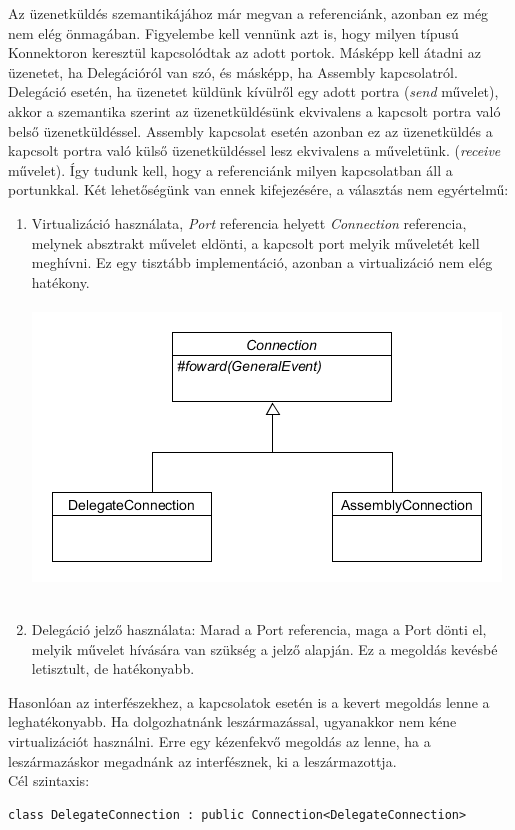 \documentclass[a4paper,12pt]{report}
\begin{document}
Az üzenetküldés szemantikájához már megvan a referenciánk, azonban ez még nem elég önmagában. Figyelembe kell vennünk azt is, hogy milyen típusú Konnektoron keresztül kapcsolódtak az adott portok. Másképp kell átadni az üzenetet, ha Delegációról van szó, és másképp, ha Assembly kapcsolatról. Delegáció esetén, ha üzenetet küldünk kívülről egy adott portra (\textit{send} művelet), akkor a szemantika szerint az üzenetküldésünk ekvivalens a kapcsolt portra való belső üzenetküldéssel. Assembly kapcsolat esetén azonban ez az üzenetküldés a kapcsolt portra való külső üzenetküldéssel lesz ekvivalens a műveletünk. (\textit{receive} művelet). Így tudunk kell, hogy a referenciánk milyen kapcsolatban áll a portunkkal. Két lehetőségünk van ennek kifejezésére, a választás nem egyértelmű:
\begin{enumerate}
\item Virtualizáció használata, \textit{Port} referencia helyett \textit{Connection} referencia, melynek absztrakt művelet eldönti, a kapcsolt port melyik műveletét kell meghívni. Ez egy tisztább implementáció, azonban a virtualizáció nem elég hatékony. \\\\
\includegraphics[scale=0.7]{connection.png} \\ \\
\item Delegáció jelző használata: Marad a Port referencia, maga a Port dönti el, melyik művelet hívására van szükség a jelző alapján. Ez a megoldás kevésbé letisztult, de hatékonyabb. \\

\end{enumerate}


Hasonlóan az interfészekhez, a kapcsolatok esetén is a kevert megoldás lenne a leghatékonyabb. Ha dolgozhatnánk leszármazással, ugyanakkor nem kéne virtualizációt használni. Erre egy kézenfekvő megoldás az lenne, ha a leszármazáskor megadnánk az interfésznek, ki a leszármazottja. \\
Cél szintaxis:
\begin{lstlisting}
class DelegateConnection : public Connection<DelegateConnection>
\end{lstlisting}
\end{document}
